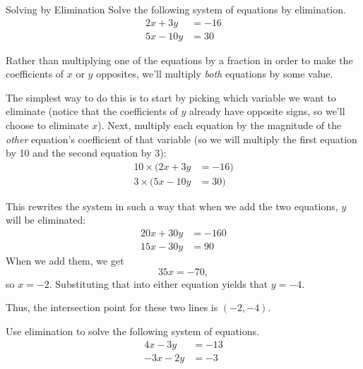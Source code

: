 \begin{example}[https://www.youtube.com/watch?v=fN5tA1onlu4]{Solving by Elimination}
Solve the following system of equations by elimination.
\begin{align*}
2x+3y &= -16\\
5x-10y &= 30
\end{align*}

\sol
Rather than multiplying one of the equations by a fraction in order to make the coefficients of $x$ or $y$ opposites, we'll multiply \emph{both} equations by some value.  

The simplest way to do this is to start by picking which variable we want to eliminate (notice that the coefficients of $y$ already have opposite signs, so we'll choose to eliminate $x$).  Next, multiply each equation by the magnitude of the \emph{other} equation's coefficient of that variable (so we will multiply the first equation by 10 and the second equation by 3):
\begin{align*}
10 \times (2x+3y &= -16)\\
3 \times (5x-10y &= 30)
\end{align*}

This rewrites the system in such a way that when we add the two equations, $y$ will be eliminated:
\begin{align*}
20x+30y &= -160\\
15x-30y &= 90
\end{align*}
When we add them, we get \[35x=-70,\] so $x=-2$.  Substituting that into either equation yields that $y=-4$.

Thus, the intersection point for these two lines is $(-2,-4)$.
\end{example}

\begin{try}
Use elimination to solve the following system of equations.
\begin{align*}
4x-3y &= -13\\
-3x-2y &= -3
\end{align*}
\end{try}
\vfill
\pagebreak

